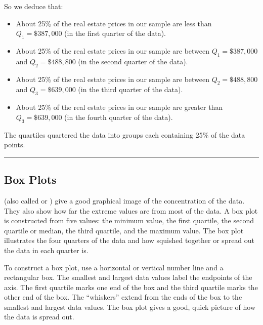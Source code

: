 \documentclass[letterpaper,10pt,english]{jupyterBook}
\begin{document}
\sphinxAtStartPar
So we deduce that:
\begin{itemize}
\item {} 
\sphinxAtStartPar
About 25\% of the real estate prices in our sample are less than \(Q_1 = \$387,000\) (in the first quarter of the data).

\item {} 
\sphinxAtStartPar
About 25\% of the real estate prices in our sample are between \(Q_1 = \$387,000\) and \(Q_2 = \$488,800\) (in the second quarter of the data).

\item {} 
\sphinxAtStartPar
About 25\% of the real estate prices in our sample are between \(Q_2 = \$488,800\) and \(Q_3 = \$639,000\) (in the third quarter of the data).

\item {} 
\sphinxAtStartPar
About 25\% of the real estate prices in our sample are greater than \(Q_3 = \$639,000\) (in the fourth quarter of the data).

\end{itemize}

\sphinxAtStartPar
The quartiles quartered the data into groups each containing 25\% of the data points.


\bigskip\hrule\bigskip



\subsection{Box Plots}
\label{\detokenize{Ch2 Descriptive Statistics/2.1 Measures of Position:box-plots}}
\sphinxAtStartPar
{} (also called  or ) give a good graphical image of the concentration of the data. They also show how far the extreme values are from most of the data. A box plot is constructed from five values: the minimum value, the first quartile, the second quartile or median, the third quartile, and the maximum value. The box plot illustrates the four quarters of the data and how squished together or spread out the data in each quarter is.

\sphinxAtStartPar
To construct a box plot, use a horizontal or vertical number line and a rectangular box. The smallest and largest data values label the endpoints of the axis. The first quartile marks one end of the box and the third quartile marks the other end of the box.  The “whiskers” extend from the ends of the box to the smallest and largest data values. The box plot gives a good, quick picture of how the data is spread out.
\end{document}
